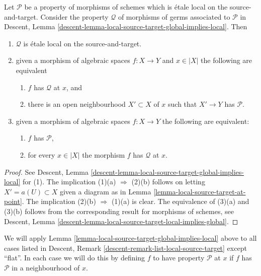 \begin{lemma}
\label{lemma-local-source-target-global-implies-local}
Let $\mathcal{P}$ be a property of morphisms of schemes
which is \'etale local on the source-and-target.
Consider the property $\mathcal{Q}$ of morphisms
of germs associated to $\mathcal{P}$ in
Descent, Lemma \ref{descent-lemma-local-source-target-global-implies-local}.
Then
\begin{enumerate}
\item $\mathcal{Q}$ is \'etale local on the source-and-target.
\item given a morphism of algebraic spaces $f : X \to Y$ and $x \in |X|$
the following are equivalent
\begin{enumerate}
\item $f$ has $\mathcal{Q}$ at $x$, and
\item there is an open neighbourhood $X' \subset X$ of $x$
such that $X' \to Y$ has $\mathcal{P}$.
\end{enumerate}
\item given a morphism of algebraic spaces $f : X \to Y$
the following are equivalent:
\begin{enumerate}
\item $f$ has $\mathcal{P}$,
\item for every $x \in |X|$ the morphism $f$ has $\mathcal{Q}$ at $x$.
\end{enumerate}
\end{enumerate}
\end{lemma}

\begin{proof}
See
Descent, Lemma \ref{descent-lemma-local-source-target-global-implies-local}
for (1). The implication (1)(a) $\Rightarrow$ (2)(b) follows on letting
$X' = a(U) \subset X$ given a diagram as in
Lemma \ref{lemma-local-source-target-at-point}.
The implication (2)(b) $\Rightarrow$ (1)(a) is clear.
The equivalence of (3)(a) and (3)(b) follows from the corresponding
result for morphisms of schemes, see
Descent, Lemma \ref{descent-lemma-local-source-target-local-implies-global}.
\end{proof}

\begin{remark}
\label{remark-when-apply}
We will apply
Lemma \ref{lemma-local-source-target-global-implies-local}
above to all cases listed in
Descent, Remark \ref{descent-remark-list-local-source-target}
except ``flat''. In each case we will do this by defining
$f$ to have property $\mathcal{P}$ at $x$ if $f$ has
$\mathcal{P}$ in a neighbourhood of $x$.
\end{remark}




